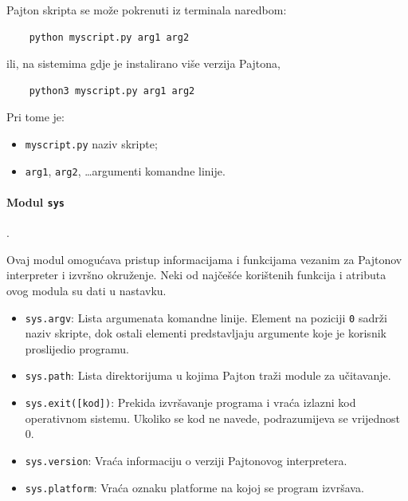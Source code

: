 Pajton skripta se može pokrenuti iz terminala naredbom:

\begin{verbatim}
	python myscript.py arg1 arg2
\end{verbatim}

ili, na sistemima gdje je instalirano više verzija Pajtona,

\begin{verbatim}
	python3 myscript.py arg1 arg2
\end{verbatim}

Pri tome je:

\begin{itemize}
	\item \texttt{myscript.py} naziv skripte;
	\item \texttt{arg1}, \texttt{arg2}, \ldots argumenti komandne linije.
\end{itemize}

\paragraph{Modul \texttt{sys}}. 

Ovaj modul omogućava pristup informacijama i funkcijama vezanim za Pajtonov interpreter i izvršno okruženje. Neki od najčešće korištenih funkcija i atributa ovog modula su dati u nastavku.

\begin{itemize}
	
	\item \texttt{sys.argv}:  Lista argumenata komandne linije. Element na poziciji \texttt{0} sadrži naziv skripte, dok ostali elementi predstavljaju argumente koje je korisnik proslijedio programu.
	
	\item \texttt{sys.path}: Lista direktorijuma u kojima Pajton traži module za učitavanje.
	
	\item \texttt{sys.exit([kod])}:  Prekida izvršavanje programa i vraća izlazni kod operativnom sistemu. Ukoliko se kod ne navede, podrazumijeva se vrijednost 0.
	
	\item \texttt{sys.version}: Vraća informaciju o verziji Pajtonovog interpretera.
	
	\item \texttt{sys.platform}: Vraća oznaku platforme na kojoj se program izvršava.
	
\end{itemize}

